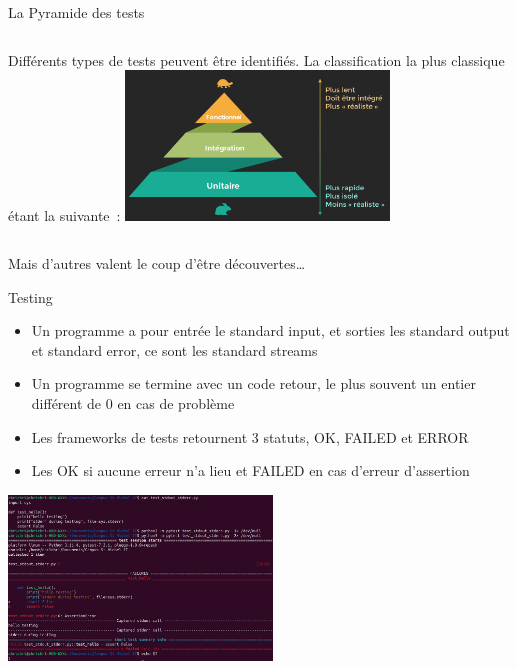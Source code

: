 \documentclass{beamer}
\begin{document}
    \begin{frame}{La Pyramide des tests}
        \begin{columns}
            Différents types de tests peuvent être identifiés.
            La classification la plus classique étant la suivante\footnotemark~:
            \centering
            \includegraphics[width=7cm]{image/classic-test-pyramid}
        \end{columns}
        \bigbreak
        Mais d'autres valent le coup d'être découvertes\ldots

    \end{frame}

    \begin{frame}{Testing}

        \begin{itemize}

            \item Un programme a pour entrée le standard input, et sorties les standard output et standard error, ce sont les standard streams
            \item Un programme se termine avec un code retour, le plus souvent un entier différent de 0 en cas de problème
            \item Les frameworks de tests retournent 3 statuts, OK, FAILED et ERROR
            \item Les OK si aucune erreur n'a lieu et FAILED en cas d'erreur d'assertion

        \end{itemize}

        \bigbreak

        \centering
        \includegraphics[width=7cm]{image/terminal-test-report}

    \end{frame}
\end{document}
